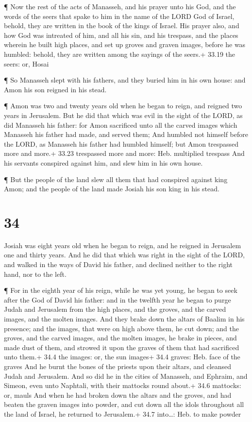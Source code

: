  ¶ Now the rest of the acts of Manasseh, and his prayer
unto his God, and the words of the seers that spake to him in the name
of the LORD God of Israel, behold, they are written in the book of the
kings of Israel.  His prayer also, and how God was
intreated of him, and all his sin, and his trespass, and the places
wherein he built high places, and set up groves and graven images,
before he was humbled: behold, they are written among the sayings of the
seers.+ 33.19 the seers: or, Hosai

 ¶ So Manasseh slept with his fathers, and they buried him
in his own house: and Amon his son reigned in his stead.

 ¶ Amon was two and twenty years old when he began to
reign, and reigned two years in Jerusalem.  But he did that
which was evil in the sight of the LORD, as did Manasseh his father: for
Amon sacrificed unto all the carved images which Manasseh his father had
made, and served them;  And humbled not himself before the
LORD, as Manasseh his father had humbled himself; but Amon trespassed
more and more.+ 33.23 trespassed more and more: Heb. multiplied trespass
 And his servants conspired against him, and slew him in
his own house.

 ¶ But the people of the land slew all them that had
conspired against king Amon; and the people of the land made Josiah his
son king in his stead.

\hypertarget{section-33}{%
\section{34}\label{section-33}}

 Josiah was eight years old when he began to reign, and he
reigned in Jerusalem one and thirty years.  And he did that
which was right in the sight of the LORD, and walked in the ways of
David his father, and declined neither to the right hand, nor to the
left.

 ¶ For in the eighth year of his reign, while he was yet
young, he began to seek after the God of David his father: and in the
twelfth year he began to purge Judah and Jerusalem from the high places,
and the groves, and the carved images, and the molten images.
 And they brake down the altars of Baalim in his presence;
and the images, that were on high above them, he cut down; and the
groves, and the carved images, and the molten images, he brake in
pieces, and made dust of them, and strowed it upon the graves of them
that had sacrificed unto them.+ 34.4 the images: or, the sun images+
34.4 graves: Heb. face of the graves  And he burnt the bones
of the priests upon their altars, and cleansed Judah and Jerusalem.
 And so did he in the cities of Manasseh, and Ephraim, and
Simeon, even unto Naphtali, with their mattocks round about.+ 34.6
mattocks: or, mauls  And when he had broken down the altars
and the groves, and had beaten the graven images into powder, and cut
down all the idols throughout all the land of Israel, he returned to
Jerusalem.+ 34.7 into\ldots: Heb. to make powder

